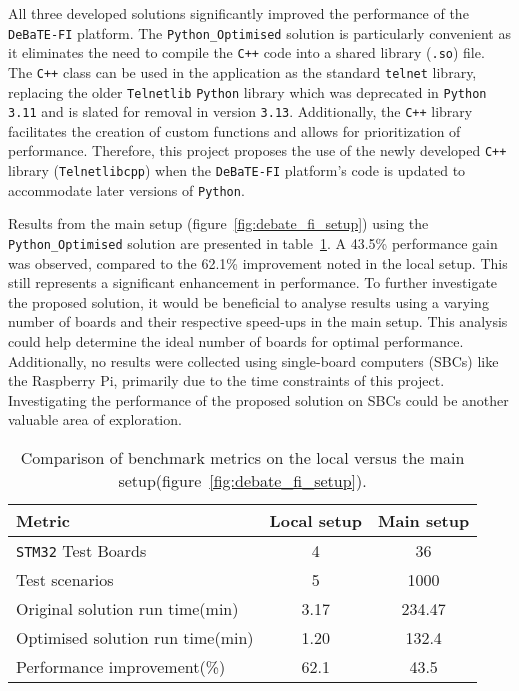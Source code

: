 All three developed solutions significantly improved the performance of the \texttt{DeBaTE-FI} platform. The \texttt{Python\_Optimised} solution is particularly convenient as it eliminates the need to compile the \texttt{C++} code into a shared library (\texttt{.so}) file. The \texttt{C++} class can be used in the application as the standard \texttt{telnet} library, replacing the older \texttt{Telnetlib} \texttt{Python} library which was deprecated in \texttt{Python 3.11} and is slated for removal in version \texttt{3.13}. Additionally, the \texttt{C++} library facilitates the creation of custom functions and allows for prioritization of performance. Therefore, this project proposes the use of the newly developed \texttt{C++} library (\texttt{Telnetlibcpp}) when the \texttt{DeBaTE-FI} platform's code is updated to accommodate later versions of \texttt{Python}.

Results from the main setup (figure~\ref{fig:debate_fi_setup}) using the \texttt{Python\_Optimised} solution are presented in table~\ref{tab:debate_metrics}. A 43.5\% performance gain was observed, compared to the 62.1\% improvement noted in the local setup. This still represents a significant enhancement in performance. To further investigate the proposed solution, it would be beneficial to analyse results using a varying number of boards and their respective speed-ups in the main setup. This analysis could help determine the ideal number of boards for optimal performance. Additionally, no results were collected using single-board computers (SBCs) like the Raspberry Pi, primarily due to the time constraints of this project. Investigating the performance of the proposed solution on SBCs could be another valuable area of exploration.

\begin{table}[htbp]
	\centering
	\begin{tabular}{@{}lcc@{}} %
		\toprule
		\textbf{Metric} & \textbf{Local setup} & \textbf{Main setup} \\
		\midrule
		\texttt{STM32} Test Boards & 4 & 36 \\
		Test scenarios & 5 & 1000 \\
		Original solution run time(min) & 3.17 & 234.47 \\
		Optimised solution run time(min) & 1.20 & 132.4 \\
		Performance improvement(\%) & 62.1 & 43.5 \\
		\bottomrule
	\end{tabular}
	\caption{Comparison of benchmark metrics on the local versus the main setup(figure~\ref{fig:debate_fi_setup}).}
	\label{tab:debate_metrics}
\end{table}